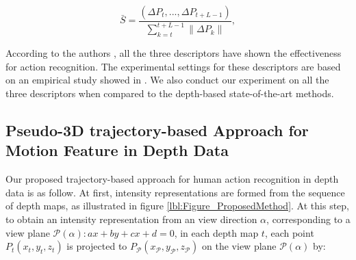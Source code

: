 \documentclass[review]{elsarticle}
\begin{document}
\begin{equation}
	\textit{$\bar{S} = \frac{(\Delta P_t, ..., \Delta P_{t+L-1})}{\sum_{k=t}^{t+L-1}\|\Delta P_k\|}$},
\end{equation}
\fi

According to the authors \cite{laptev2008learning, wang2011densetraj, wang2009evaluation, liu2009recognizing}, all the three descriptors have shown the effectiveness for action recognition. The experimental settings for these descriptors are based on an empirical study showed in \cite{wang2011densetraj}. We also conduct our experiment on all the three descriptors when compared to the depth-based state-of-the-art methods.

\subsection{Pseudo-3D trajectory-based Approach for Motion Feature in Depth Data}

Our proposed trajectory-based approach for human action recognition in depth data is as follow. At first, intensity representations are formed from the sequence of depth maps, as illustrated in figure \ref{lbl:Figure_ProposedMethod}. At this step, to obtain an intensity representation from an view direction $\alpha$, corresponding to a view plane $\mathcal{P}(\alpha): ax + by + cx + d = 0$, in each depth map $t$, each point $P_t(x_t,y_t,z_t)$ is projected to $P_\mathcal{P}(x_\mathcal{P},y_\mathcal{P},z_\mathcal{P})$ on the view plane $\mathcal{P}(\alpha)$ by:
\end{document}
